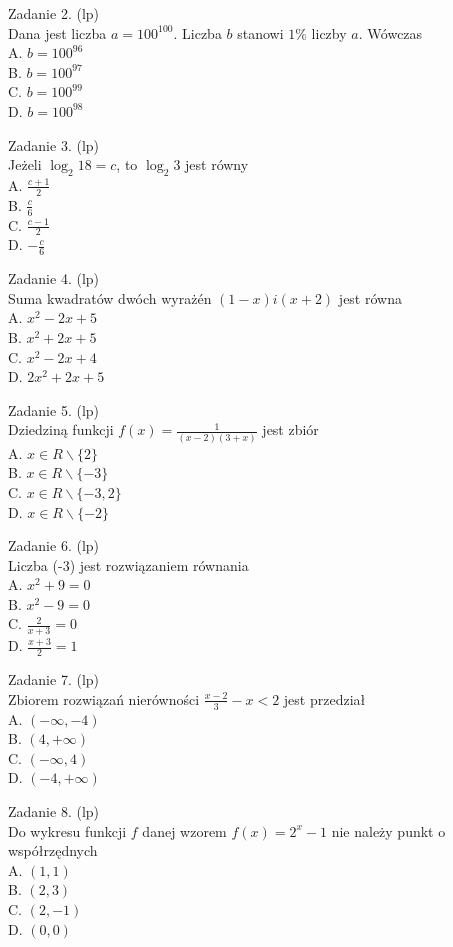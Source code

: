 \documentclass[10pt]{article}
\begin{document}
Zadanie 2. (lp)\\
Dana jest liczba \(a=100^{100}\). Liczba \(b\) stanowi \(1 \%\) liczby \(a\). Wówczas\\
A. \(b=100^{96}\)\\
B. \(b=100^{97}\)\\
C. \(b=100^{99}\)\\
D. \(b=100^{98}\)

Zadanie 3. (lp)\\
Jeżeli \(\log _{2} 18=c\), to \(\log _{2} 3\) jest równy\\
A. \(\frac{c+1}{2}\)\\
B. \(\frac{c}{6}\)\\
C. \(\frac{c-1}{2}\)\\
D. \(-\frac{c}{6}\)

Zadanie 4. (lp)\\
Suma kwadratów dwóch wyrażén \((1-x) i(x+2)\) jest równa\\
A. \(x^{2}-2 x+5\)\\
B. \(x^{2}+2 x+5\)\\
C. \(x^{2}-2 x+4\)\\
D. \(2 x^{2}+2 x+5\)

Zadanie 5. (lp)\\
Dziedziną funkcji \(f(x)=\frac{1}{(x-2)(3+x)}\) jest zbiór\\
A. \(x \in R \backslash\{2\}\)\\
B. \(x \in R \backslash\{-3\}\)\\
C. \(x \in R \backslash\{-3,2\}\)\\
D. \(x \in R \backslash\{-2\}\)

Zadanie 6. (lp)\\
Liczba (-3) jest rozwiązaniem równania\\
A. \(x^{2}+9=0\)\\
B. \(x^{2}-9=0\)\\
C. \(\frac{2}{x+3}=0\)\\
D. \(\frac{x+3}{2}=1\)

Zadanie 7. (lp)\\
Zbiorem rozwiązań nierówności \(\frac{x-2}{3}-x<2\) jest przedział\\
A. \((-\infty,-4)\)\\
B. \((4,+\infty)\)\\
C. \((-\infty, 4)\)\\
D. \((-4,+\infty)\)

Zadanie 8. (lp)\\
Do wykresu funkcji \(f\) danej wzorem \(f(x)=2^{x}-1\) nie należy punkt o współrzędnych\\
A. \((1,1)\)\\
B. \((2,3)\)\\
C. \((2,-1)\)\\
D. \((0,0)\)
\end{document}
